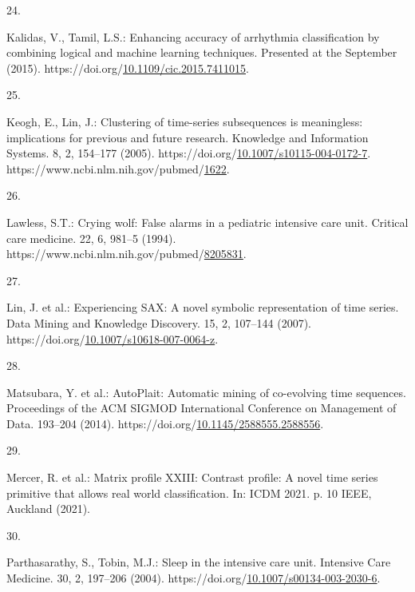 \documentclass[runningheads]{llncs}
\newlength{\cslhangindent}
\newlength{\csllabelwidth}
\newenvironment{CSLReferences}[2] %
 {%
  \setlength{\parindent}{0pt}
  \ifodd #1 \everypar{\setlength{\hangindent}{\cslhangindent}}\ignorespaces\fi
  \ifnum #2 > 0
  \setlength{\parskip}{#2\baselineskip}
  \fi
 }%
 {}
\newcommand{\CSLLeftMargin}[1]{\parbox[t]{\csllabelwidth}{#1}}
\newcommand{\CSLRightInline}[1]{\parbox[t]{\linewidth - \csllabelwidth}{#1}\break}
\begin{document}
\begin{CSLReferences}{0}{0}
\leavevmode{}%
\CSLLeftMargin{24. }
\CSLRightInline{Kalidas, V., Tamil, L.S.: Enhancing accuracy of arrhythmia classification by combining logical and machine learning techniques. Presented at the September (2015). https://doi.org/\href{https://doi.org/10.1109/cic.2015.7411015}{10.1109/cic.2015.7411015}.}

\leavevmode{}%
\CSLLeftMargin{25. }
\CSLRightInline{Keogh, E., Lin, J.: {Clustering of time-series subsequences is meaningless: implications for previous and future research}. Knowledge and Information Systems. 8, 2, 154--177 (2005). https://doi.org/\href{https://doi.org/10.1007/s10115-004-0172-7}{10.1007/s10115-004-0172-7}. https://www.ncbi.nlm.nih.gov/pubmed/\href{https://www.ncbi.nlm.nih.gov/pubmed/1622}{1622}.}

\leavevmode{}%
\CSLLeftMargin{26. }
\CSLRightInline{Lawless, S.T.: Crying wolf: False alarms in a pediatric intensive care unit. Critical care medicine. 22, 6, 981--5 (1994). https://www.ncbi.nlm.nih.gov/pubmed/\href{https://www.ncbi.nlm.nih.gov/pubmed/8205831}{8205831}.}

\leavevmode{}%
\CSLLeftMargin{27. }
\CSLRightInline{Lin, J. et al.: {Experiencing SAX: A novel symbolic representation of time series}. Data Mining and Knowledge Discovery. 15, 2, 107--144 (2007). https://doi.org/\href{https://doi.org/10.1007/s10618-007-0064-z}{10.1007/s10618-007-0064-z}.}

\leavevmode{}%
\CSLLeftMargin{28. }
\CSLRightInline{Matsubara, Y. et al.: AutoPlait: Automatic mining of co-evolving time sequences. Proceedings of the ACM SIGMOD International Conference on Management of Data. 193--204 (2014). https://doi.org/\href{https://doi.org/10.1145/2588555.2588556}{10.1145/2588555.2588556}.}

\leavevmode{}%
\CSLLeftMargin{29. }
\CSLRightInline{Mercer, R. et al.: Matrix profile XXIII: Contrast profile: A novel time series primitive that allows real world classification. In: ICDM 2021. p. 10 IEEE, Auckland (2021).}

\leavevmode{}%
\CSLLeftMargin{30. }
\CSLRightInline{Parthasarathy, S., Tobin, M.J.: Sleep in the intensive care unit. Intensive Care Medicine. 30, 2, 197--206 (2004). https://doi.org/\href{https://doi.org/10.1007/s00134-003-2030-6}{10.1007/s00134-003-2030-6}.}


\end{CSLReferences}
\end{document}
